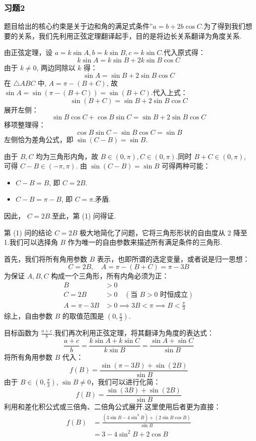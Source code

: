 \subsubsection{习题2}
\begin{solution}
	题目给出的核心约束是关于边和角的满足式条件”$a=b+2b\cos C$.为了得到我们想要的关系，我们先利用正弦定理翻译起手，目的是将边长关系翻译为角度关系.
	
	由正弦定理，设 $a=k\sin A, b=k\sin B, c=k\sin C$.代入原式得：
	\[
	k\sin A = k\sin B + 2k\sin B \cos C
	\]
	由于 $k \neq 0$, 两边同除以 $k$ 得：
	\[
	\sin A = \sin B + 2\sin B \cos C
	\]
	在 $\triangle ABC$ 中, $A = \pi-(B+C)$, 故 $\sin A = \sin(\pi-(B+C)) = \sin(B+C)$.代入上式：
	\[
	\sin(B+C) = \sin B + 2\sin B \cos C
	\]
	展开左侧：
	\[
	\sin B \cos C + \cos B \sin C = \sin B + 2\sin B \cos C
	\]
	移项整理得：
	\[
	\cos B \sin C - \sin B \cos C = \sin B
	\]
	左侧恰为差角公式，即 $\sin(C-B) = \sin B$.
	
	由于 $B,C$ 均为三角形内角，故 $B \in (0,\pi), C \in (0,\pi)$.同时 $B+C \in (0,\pi)$, 可得 $C-B \in (-\pi, \pi)$.
	由 $\sin(C-B)=\sin B$ 可得两种可能：
	\begin{itemize}
		\item $C-B = B$, 即 $C=2B$.
		\item $C-B = \pi - B$, 即 $C=\pi$.矛盾.
	\end{itemize}
	因此， $C=2B$.至此，第 (1) 问得证.
	
	第 (1) 问的结论 $C=2B$ 极大地简化了问题，它将三角形形状的自由度从 2 降至 1.我们可以选择角 $B$ 作为唯一的自由参数来描述所有满足条件的三角形.
	
	首先，我们将所有角用参数 $B$ 表示，也即所谓的选定变量，或者说是归一思想：
	\[
	C=2B, \quad A = \pi - (B+C) = \pi - 3B
	\]
	为保证 $A,B,C$ 构成一个三角形，所有内角必须为正：
	\begin{align*}
		B &> 0 \\
		C = 2B &> 0 \quad (\text{当 } B>0 \text{ 时恒成立}) \\
		A = \pi - 3B &> 0 \implies 3B < \pi \implies B < \frac{\pi}{3}
	\end{align*}
	综上，自由参数 $B$ 的取值范围是 $(0, \frac{\pi}{3})$.
	
	目标函数为 $\frac{a+c}{b}$.我们再次利用正弦定理，将其翻译为角度的表达式：
	\[
	\frac{a+c}{b} = \frac{k\sin A + k\sin C}{k\sin B} = \frac{\sin A + \sin C}{\sin B}
	\]
	将所有角用参数 $B$ 代入：
	\[
	f(B) = \frac{\sin(\pi-3B)+\sin(2B)}{\sin B}
	\]
	由于 $B \in (0, \frac{\pi}{3})$, $\sin B \neq 0$，我们可以进行化简：
	\[
	f(B) = \frac{\sin(3B)+\sin(2B)}{\sin B}
	\]
	利用和差化积公式或三倍角、二倍角公式展开.这里使用后者更为直接：
	\begin{align*}
		f(B) &= \frac{(3\sin B - 4\sin^3 B) + (2\sin B \cos B)}{\sin B} \\
		&= 3 - 4\sin^2 B + 2\cos B
	\end{align*}
	

\end{solution}
